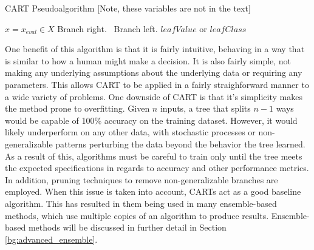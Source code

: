 	\begin{algorithm}[ht]
		\caption{CART Pseudoalgorithm [Note, these variables are not in the text] }
		\label{code:bg_cart}
		\begin{algorithmic}[1]
			\State $x = x_{eval} \in X$
			 Branch right.
			\Else \ Branch left.
			\EndIf
			\EndWhile
			\State \Return $leafValue$ or $leafClass$
			\EndProcedure
		\end{algorithmic}
	\end{algorithm}

	\par One benefit of this algorithm is that it is fairly intuitive, behaving in a way that is similar to how a human might make a decision. It is also fairly simple, not making any underlying assumptions about the underlying data or requiring any parameters. This allows CART to be applied in a fairly straighforward manner to a wide variety of problems. One downside of CART is that it's simplicity makes the method prone to overfitting. Given $n$ inputs, a tree that splits $n-1$ ways would be capable of 100\% accuracy on the training dataset. However, it would likely underperform on any other data, with stochastic processes or non-generalizable patterns perturbing the data beyond the behavior the tree learned. As a result of this, algorithms must be careful to train only until the tree meets the expected specifications in regards to accuracy and other performance metrics. In addition, pruning techniques to remove non-generalizable branches are employed. When this issue is taken into account, CARTs act as a good baseline algorithm. This has resulted in them being used in many ensemble-based methods, which use multiple copies of an algorithm to produce results. Ensemble-based methods will be discussed in further detail in Section \ref{bg:advanced_ensemble}.
	

